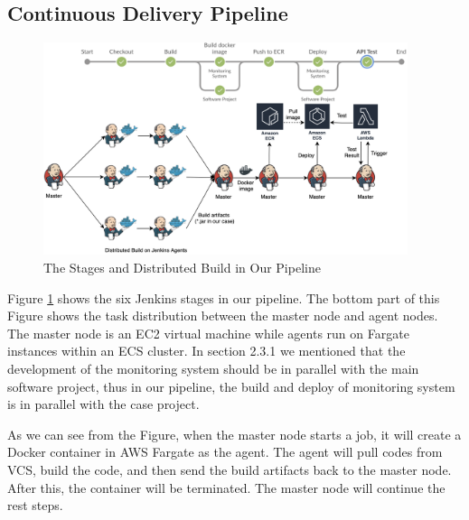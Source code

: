 \subsection{Continuous Delivery Pipeline}
\label{our-ci}
\begin{figure}[h]
 \centering
 \includegraphics[width=0.95\textwidth]{pics/overview.png}
 \caption{The Stages and Distributed Build in Our Pipeline}
 \label{fig:overview}
\end{figure}
Figure \ref{fig:overview} shows the six Jenkins stages in our pipeline. The bottom part of this Figure shows the task distribution between the master node and agent nodes. The master node is an EC2 virtual machine while agents run on Fargate instances within an ECS cluster. In section 2.3.1 we mentioned that the development of the monitoring system should be in parallel with the main software project, thus in our pipeline, the build and deploy of monitoring system is in parallel with the case project.
\par
As we can see from the Figure, when the master node starts a job, it will create a Docker container in AWS Fargate as the agent. The agent will pull codes from VCS, build the code, and then send the build artifacts back to the master node. After this, the container will be terminated. The master node will continue the rest steps.
